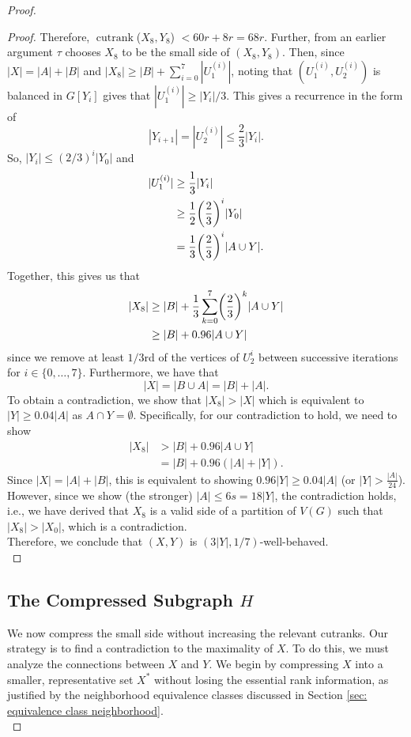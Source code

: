 \documentclass{article}
\theoremstyle{definition}
\let\originalleft\left
\let\originalright\right
\renewcommand{\left}{\mathopen{}\mathclose\bgroup\originalleft}
\renewcommand{\right}{\aftergroup\egroup\originalright}
\begin{document}
\begin{proof}
\begin{proof}
Therefore, $\operatorname{cutrank}$($X_8, Y_8$) $< 60r + 8r = 68r$. Further, from an earlier argument $\tau$ chooses $X_8$ to be the small side of $(X_8, Y_8)$. Then, since $|X| = |A| + |B|$ and $|X_8| \geq |B| + \sum_{i=0}^7 |U_1^{(i)}|$, noting that $(U_1^{(i)}, U_2^{(i)})$ is balanced in $G[Y_i]$ gives that $|U_1^{(i)}| \geq |Y_i|/3$. This gives a recurrence in the form of \[|Y_{i+1}| = |U_2^{(i)}| \leq \frac{2}{3}|Y_i|.\] So, $|Y_i| \leq (2/3)^i |Y_0|$ and
\begin{align*}|U_1^{(i)}| &\geq \frac{1}{3}|Y_i| \\
&\geq \frac{1}{2}\left(\frac{2}{3}\right)^i |Y_0| \\
&= \frac{1}{3}\left(\frac{2}{3}\right)^i |A\cup Y|.\end{align*} Together, this gives us that 
\begin{align*}|X_8| &\geq |B| + \frac{1}{3}\sum_{k=0}^7\left(\frac{2}{3}\right)^k|A\cup Y| \\ &\geq |B| + 0.96|A\cup Y|\end{align*}
since we remove at least $1/3$rd of the vertices of $U_2^i$ between successive iterations for $i\in\{0,\dots,7\}$. Furthermore, we have that \[|X|=|B\cup A|=|B|+|A|.\]
To obtain a contradiction, we show that $|X_8|> |X|$ which is equivalent to $|Y|\geq 0.04|A|$ as $A\cap Y=\emptyset$. Specifically, for our contradiction to hold, we need to show \begin{align*}|X_8| &> |B| + 0.96 |A\cup Y| \\
&= |B| + 0.96(|A| + |Y|).\end{align*} Since $|X| = |A| + |B|$, this is equivalent to showing $0.96|Y| \geq 0.04|A|$ (or $|Y| > \frac{|A|}{24}$).\\

However, since we show (the stronger) $|A|\leq 6s = 18|Y|$, the contradiction holds, i.e., we have derived that $X_8$ is a valid side of a partition of $V(G)$ such that $|X_8|>|X_0|$, which is a contradiction. \\

Therefore, we conclude that $(X,Y)$ is $(3|Y|, 1/7)$-well-behaved. \qedhere\\
\end{proof}

\subsection{The Compressed Subgraph $H$}
We now compress the small side without increasing the relevant cutranks. Our strategy is to find a contradiction to the maximality of $X$. To do this, we must analyze the connections between $X$ and $Y$. We begin by compressing $X$ into a smaller, representative set $X^*$ without losing the essential rank information, as justified by the neighborhood equivalence classes discussed in Section \ref{sec: equivalence class neighborhood}.\\


\end{proof}
\end{document}
